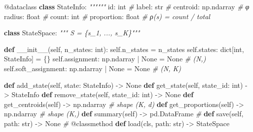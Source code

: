 \documentclass[
  12pt,
]{article}
\newenvironment{Shaded}{}{}
\newcommand{\AttributeTok}[1]{\textcolor[rgb]{0.49,0.56,0.16}{#1}}
\newcommand{\BuiltInTok}[1]{\textcolor[rgb]{0.00,0.50,0.00}{#1}}
\newcommand{\CommentTok}[1]{\textcolor[rgb]{0.38,0.63,0.69}{\textit{#1}}}
\newcommand{\FunctionTok}[1]{\textcolor[rgb]{0.02,0.16,0.49}{#1}}
\newcommand{\KeywordTok}[1]{\textcolor[rgb]{0.00,0.44,0.13}{\textbf{#1}}}
\newcommand{\NormalTok}[1]{#1}
\newcommand{\OperatorTok}[1]{\textcolor[rgb]{0.40,0.40,0.40}{#1}}
\newcommand{\VariableTok}[1]{\textcolor[rgb]{0.10,0.09,0.49}{#1}}
\begin{document}
\begin{Shaded}
\begin{Highlighting}[]
\AttributeTok{@dataclass}
\KeywordTok{class}\NormalTok{ StateInfo:}
    \CommentTok{""""""}
    \BuiltInTok{id}\NormalTok{: }\BuiltInTok{int}                          \CommentTok{\# }
\NormalTok{    label: }\BuiltInTok{str}                       \CommentTok{\# }
\NormalTok{    centroid: np.ndarray             }\CommentTok{\#  φ }
\NormalTok{    radius: }\BuiltInTok{float}                    \CommentTok{\# }
\NormalTok{    count: }\BuiltInTok{int}                       \CommentTok{\# }
\NormalTok{    proportion: }\BuiltInTok{float}                \CommentTok{\# ρ(s) = count / total}

\KeywordTok{class}\NormalTok{ StateSpace:}
    \CommentTok{""" S = \{s\_1, ..., s\_K\}"""}

    \KeywordTok{def} \FunctionTok{\_\_init\_\_}\NormalTok{(}\VariableTok{self}\NormalTok{, n\_states: }\BuiltInTok{int}\NormalTok{):}
        \VariableTok{self}\NormalTok{.n\_states }\OperatorTok{=}\NormalTok{ n\_states}
        \VariableTok{self}\NormalTok{.states: }\BuiltInTok{dict}\NormalTok{[}\BuiltInTok{int}\NormalTok{, StateInfo] }\OperatorTok{=}\NormalTok{ \{\}}
        \VariableTok{self}\NormalTok{.assignment: np.ndarray }\OperatorTok{|} \VariableTok{None} \OperatorTok{=} \VariableTok{None}        \CommentTok{\# (N,) }
        \VariableTok{self}\NormalTok{.soft\_assignment: np.ndarray }\OperatorTok{|} \VariableTok{None} \OperatorTok{=} \VariableTok{None}   \CommentTok{\# (N, K) }

    \KeywordTok{def}\NormalTok{ add\_state(}\VariableTok{self}\NormalTok{, state: StateInfo) }\OperatorTok{{-}\textgreater{}} \VariableTok{None}
    \KeywordTok{def}\NormalTok{ get\_state(}\VariableTok{self}\NormalTok{, state\_id: }\BuiltInTok{int}\NormalTok{) }\OperatorTok{{-}\textgreater{}}\NormalTok{ StateInfo}
    \KeywordTok{def}\NormalTok{ remove\_state(}\VariableTok{self}\NormalTok{, state\_id: }\BuiltInTok{int}\NormalTok{) }\OperatorTok{{-}\textgreater{}} \VariableTok{None}
    \KeywordTok{def}\NormalTok{ get\_centroids(}\VariableTok{self}\NormalTok{) }\OperatorTok{{-}\textgreater{}}\NormalTok{ np.ndarray                }\CommentTok{\# shape (K, d)}
    \KeywordTok{def}\NormalTok{ get\_proportions(}\VariableTok{self}\NormalTok{) }\OperatorTok{{-}\textgreater{}}\NormalTok{ np.ndarray              }\CommentTok{\# shape (K,)}
    \KeywordTok{def}\NormalTok{ summary(}\VariableTok{self}\NormalTok{) }\OperatorTok{{-}\textgreater{}}\NormalTok{ pd.DataFrame                    }\CommentTok{\# }
    \KeywordTok{def}\NormalTok{ save(}\VariableTok{self}\NormalTok{, path: }\BuiltInTok{str}\NormalTok{) }\OperatorTok{{-}\textgreater{}} \VariableTok{None}                    \CommentTok{\# }
    \AttributeTok{@classmethod}
    \KeywordTok{def}\NormalTok{ load(cls, path: }\BuiltInTok{str}\NormalTok{) }\OperatorTok{{-}\textgreater{}}\NormalTok{ StateSpace}
\end{Highlighting}
\end{Shaded}
\end{document}
